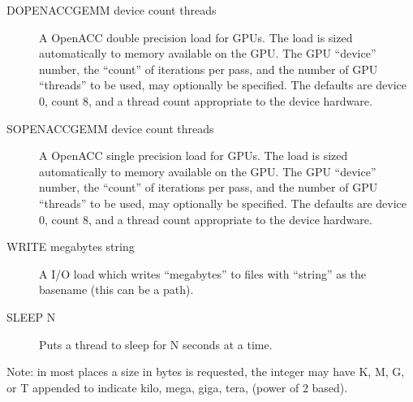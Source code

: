 \begin{description}
        \item[DOPENACCGEMM device count threads] A OpenACC double precision load for GPUs. The load is sized automatically to memory available on the GPU. The GPU ``device'' number, the ``count''
        of iterations per pass, and the number of GPU ``threads'' to be used, may optionally be specified.  The defaults are device 0, count 8, and a thread count appropriate to the device hardware.
        \item[SOPENACCGEMM device count threads] A OpenACC single precision load for GPUs. The load is sized automatically to memory available on the GPU. The GPU ``device'' number, the ``count''
        of iterations per pass, and the number of GPU ``threads'' to be used, may optionally be specified.  The defaults are device 0, count 8, and a thread count appropriate to the device hardware.
	\item[WRITE megabytes string] A I/O load which writes ``megabytes'' to files with ``string'' as the basename (this can be a path).
	\item[SLEEP N] Puts a thread to sleep for N seconds at a time. 
\end{description}

Note: in most places a size in bytes is requested, the integer may have K, M, G, or T appended to indicate kilo, mega, giga, tera, (power of 2 based).
